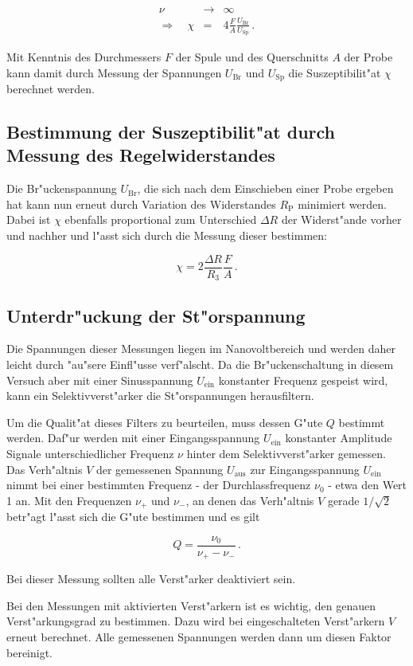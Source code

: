 		\begin{eqnarray}
			\nu & \rightarrow & \infty \nonumber \\
			\Rightarrow \quad \chi & = & 4 \frac{F}{A}\frac{U_\mathrm{Br}}{U_\mathrm{Sp}}\,. \label{chi_u}
		\end{eqnarray}

		Mit Kenntnis des Durchmessers $F$ der Spule und des Querschnitts $A$ der Probe kann damit durch Messung der Spannungen $U_\mathrm{Br}$ und $U_\mathrm{Sp}$ die Suszeptibilit"at $\chi$ berechnet werden.

	
	\subsection{Bestimmung der Suszeptibilit"at durch Messung des Regelwiderstandes}
		\label{subsec:messung_u}
		Die Br"uckenspannung $U_\mathrm{Br}$, die sich nach dem Einschieben einer Probe ergeben hat kann nun erneut durch Variation des Widerstandes $R_\mathrm{P}$ minimiert werden.
		Dabei ist $\chi$ ebenfalls proportional zum Unterschied $\Delta R$ der Widerst"ande vorher und nachher und l"asst sich durch die Messung dieser bestimmen:

		\begin{equation}
			\label{chi_r}
			\chi = 2 \frac{\Delta R}{R_3}\frac{F}{A}\,.
		\end{equation}

	\subsection{Unterdr"uckung der St"orspannung}
		Die Spannungen dieser Messungen liegen im Nanovoltbereich und werden daher leicht durch "au"sere Einfl"usse verf"alscht.
		Da die Br"uckenschaltung in diesem Versuch aber mit einer Sinusspannung $U_\mathrm{ein}$ konstanter Frequenz gespeist wird, kann ein Selektivverst"arker die St"orspannungen herausfiltern.

		Um die Qualit"at dieses Filters zu beurteilen, muss dessen G"ute $Q$ bestimmt werden.
		Daf"ur werden mit einer Eingangsspannung $U_\mathrm{ein}$ konstanter Amplitude Signale unterschiedlicher Frequenz $\nu$ hinter dem Selektivverst"arker gemessen.
		Das Verh"altnis $V$ der gemessenen Spannung $U_\mathrm{aus}$ zur Eingangsspannung $U_\mathrm{ein}$ nimmt bei einer bestimmten Frequenz - der Durchlassfrequenz $\nu_0$ - etwa den Wert 1 an.
		Mit den Frequenzen $\nu_+$ und $\nu_-$, an denen das Verh"altnis $V$ gerade $1/\sqrt{2}$ betr"agt l"asst sich die G"ute bestimmen und es gilt

		\begin{equation}
			Q = \frac{\nu_0}{\nu_+ - \nu_-}\,. \label{Gleichung:Guete}
		\end{equation}

		Bei dieser Messung sollten alle Verst"arker deaktiviert sein.

		Bei den Messungen mit aktivierten Verst"arkern ist es wichtig, den genauen Verst"arkungsgrad zu bestimmen.
		Dazu wird bei eingeschalteten Verst"arkern $V$ erneut berechnet.
		Alle gemessenen Spannungen werden dann um diesen Faktor bereinigt.